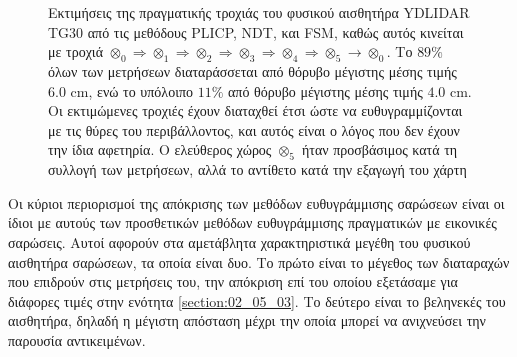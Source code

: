\begin{figure}[]\centering
  
  \vspace{-1cm}
  \caption{\small Εκτιμήσεις της πραγματικής τροχιάς του φυσικού αισθητήρα
           YDLIDAR TG30 από τις μεθόδους PLICP, NDT, και FSM, καθώς αυτός
           κινείται με τροχιά $\otimes_0 \Rightarrow \otimes_1 \Rightarrow
           \otimes_2 \Rightarrow \otimes_3 \Rightarrow \otimes_4 \Rightarrow
           \otimes_5 \rightarrow \otimes_0$. Το $89\%$ όλων των μετρήσεων
           διαταράσσεται από θόρυβο μέγιστης μέσης τιμής $6.0$ cm, ενώ το
           υπόλοιπο $11\%$ από θόρυβο μέγιστης μέσης τιμής $4.0$ cm. Οι
           εκτιμώμενες τροχιές έχουν διαταχθεί έτσι ώστε να ευθυγραμμίζονται με
           τις θύρες του περιβάλλοντος, και αυτός είναι ο λόγος που δεν έχουν
           την ίδια αφετηρία. Ο ελεύθερος χώρος $\otimes_5$ ήταν προσβάσιμος
           κατά τη συλλογή των μετρήσεων, αλλά το αντίθετο κατά την εξαγωγή του
           χάρτη}
  \label{fig:02_05_04:03}
\end{figure}


Οι κύριοι περιορισμοί της απόκρισης των μεθόδων ευθυγράμμισης σαρώσεων είναι οι
ίδιοι με αυτούς των προσθετικών μεθόδων ευθυγράμμισης πραγματικών με εικονικές
σαρώσεις. Αυτοί αφορούν στα αμετάβλητα χαρακτηριστικά μεγέθη του φυσικού
αισθητήρα σαρώσεων, τα οποία είναι δυο. Το πρώτο είναι το μέγεθος των
διαταραχών που επιδρούν στις μετρήσεις του, την απόκριση επί του οποίου
εξετάσαμε για διάφορες τιμές στην ενότητα \ref{section:02_05_03}. Το δεύτερο
είναι το βεληνεκές του αισθητήρα, δηλαδή η μέγιστη απόσταση μέχρι την οποία
μπορεί να ανιχνεύσει την παρουσία αντικειμένων.

